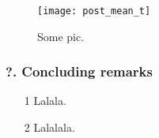  
 
 
\begin{frame} %
 \vspace*{2.0cm}
 \begin{figure}[!ht]
    \centering
    \texttt{[image: post\_mean\_t]}
    \caption{Some pic.}
 \end{figure}
\end{frame} 
 
 

\begin{frame}\frametitle{?. Concluding remarks}
\begin{enumerate}
\item[1] Lalala.
\vspace*{1.0cm}

\item[2] Lalalala.
\end{enumerate}
\end{frame} 


\begin{frame}[allowframebreaks]
\vspace*{2.0cm}
  \printbibliography
\end{frame}
